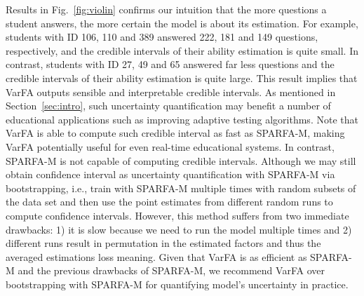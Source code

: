 \documentclass{edm_article}
\newcommand{\ml}[1]{\textcolor{orange}{\bf [LAN bandit: #1]}}
\newcommand{\jack}[1]{\textcolor{purple}{\bf [jack the ripper: #1]}}
\begin{document}
Results in Fig.~\ref{fig:violin} confirms our intuition that the more questions a student answers, the more certain the model is about its estimation. For example, students with ID 106, 110 and 389 answered 222, 181 and 149 questions, respectively, and the credible intervals of their ability estimation is quite small. In contrast, students with ID 27, 49 and 65 answered far less questions and the credible intervals of their ability estimation is quite large. This result implies that VarFA outputs sensible and interpretable credible intervals. As mentioned in Section~\ref{sec:intro}, such uncertainty quantification may benefit a number of educational applications such as improving adaptive testing algorithms. 
Note that VarFA is able to compute such credible interval as fast as SPARFA-M, making VarFA potentially useful for even real-time educational systems. In contrast, SPARFA-M is not capable of computing credible intervals. Although we may still obtain confidence interval as uncertainty quantification with SPARFA-M via bootstrapping, i.e., train with SPARFA-M multiple times with random subsets of the data set and then use the point estimates from different random runs to compute confidence intervals. However, this method suffers from two immediate drawbacks: 1) it is slow because we need to run the model multiple times and 2) different runs result in permutation in the estimated factors and thus the averaged estimations loss meaning. Given that VarFA is as efficient as SPARFA-M and the previous drawbacks of SPARFA-M, we recommend VarFA over bootstrapping with SPARFA-M for quantifying model's uncertainty in practice.

\end{document}
